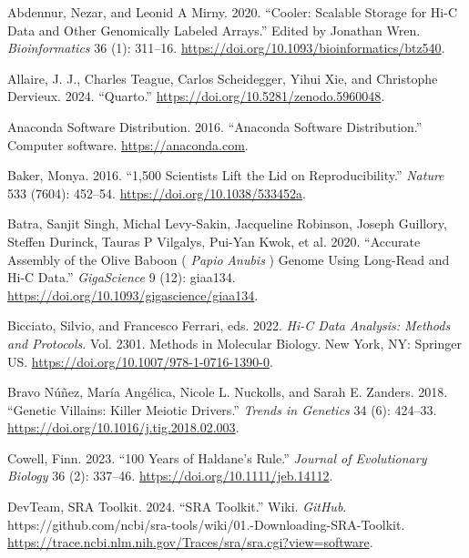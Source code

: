 \documentclass[
  11pt,
  a4paper,
]{scrbook}
\newlength{\cslhangindent}
\newenvironment{CSLReferences}[2] %
 {\begin{list}{}{%
  \setlength{\itemindent}{0pt}
  \setlength{\leftmargin}{0pt}
  \setlength{\parsep}{0pt}
  \ifodd #1
   \setlength{\leftmargin}{\cslhangindent}
   \setlength{\itemindent}{-1\cslhangindent}
  \fi
  \setlength{\itemsep}{#2\baselineskip}}}
 {\end{list}}
\let\oldemph\emph
\renewcommand\emph[1]{\oldemph{\color{gray}#1}}
\begin{document}
\label{refs}
\begin{CSLReferences}{1}{0}
Abdennur, Nezar, and Leonid A Mirny. 2020. {``Cooler: Scalable Storage
for {Hi-C} Data and Other Genomically Labeled Arrays.''} Edited by
Jonathan Wren. \emph{Bioinformatics} 36 (1): 311--16.
\url{https://doi.org/10.1093/bioinformatics/btz540}.

Allaire, J. J., Charles Teague, Carlos Scheidegger, Yihui Xie, and
Christophe Dervieux. 2024. {``{Quarto}.''}
\url{https://doi.org/10.5281/zenodo.5960048}.

Anaconda Software Distribution. 2016. {``Anaconda Software
Distribution.''} Computer software. \url{https://anaconda.com}.

Baker, Monya. 2016. {``1,500 Scientists Lift the Lid on
Reproducibility.''} \emph{Nature} 533 (7604): 452--54.
\url{https://doi.org/10.1038/533452a}.

Batra, Sanjit Singh, Michal Levy-Sakin, Jacqueline Robinson, Joseph
Guillory, Steffen Durinck, Tauras P Vilgalys, Pui-Yan Kwok, et al. 2020.
{``Accurate Assembly of the Olive Baboon ( {\emph{Papio}}{
\emph{Anubis}} ) Genome Using Long-Read and {Hi-C} Data.''}
\emph{GigaScience} 9 (12): giaa134.
\url{https://doi.org/10.1093/gigascience/giaa134}.

Bicciato, Silvio, and Francesco Ferrari, eds. 2022. \emph{Hi-{C Data
Analysis}: {Methods} and {Protocols}}. Vol. 2301. Methods in {Molecular
Biology}. New York, NY: Springer US.
\url{https://doi.org/10.1007/978-1-0716-1390-0}.

Bravo Núñez, María Angélica, Nicole L. Nuckolls, and Sarah E. Zanders.
2018. {``Genetic {Villains}: {Killer Meiotic Drivers}.''} \emph{Trends
in Genetics} 34 (6): 424--33.
\url{https://doi.org/10.1016/j.tig.2018.02.003}.

Cowell, Finn. 2023. {``100 Years of {Haldane}'s Rule.''} \emph{Journal
of Evolutionary Biology} 36 (2): 337--46.
\url{https://doi.org/10.1111/jeb.14112}.

DevTeam, SRA Toolkit. 2024. {``{SRA Toolkit}.''} Wiki. \emph{GitHub}.
https://github.com/ncbi/sra-tools/wiki/01.-Downloading-SRA-Toolkit.
\url{https://trace.ncbi.nlm.nih.gov/Traces/sra/sra.cgi?view=software}.


\end{CSLReferences}
\end{document}
